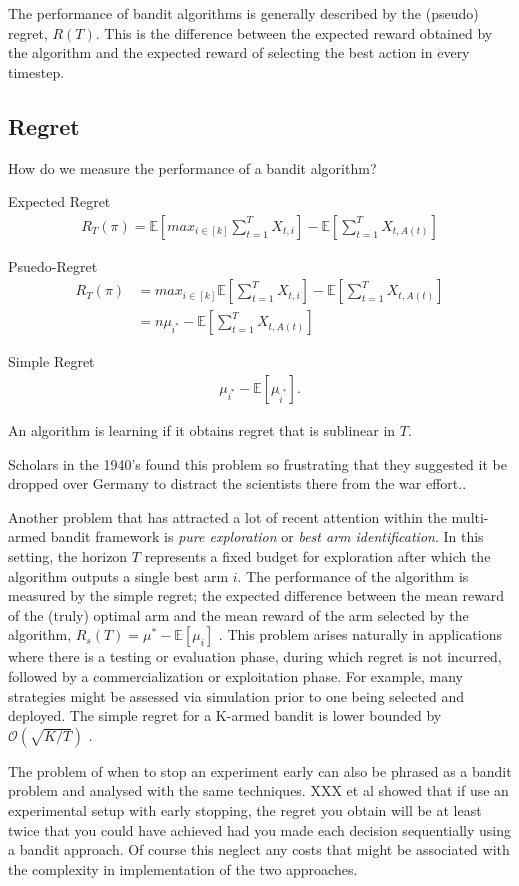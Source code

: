 \documentclass[11pt,a4paper,oneside]{book}
\newcommand{\simpleregret}{R_T}
\newcommand{\E}[1]{\mathbb E\left[{#1}\right]}
\newcommand{\eqn}[1]{\begin{align}#1\end{align}}
\newcommand{\bigo}[1]{\mathcal{O}\left( #1 \right)}
\begin{document}
The performance of bandit algorithms is generally described by the (pseudo) regret, $R(T)$. This is the difference between the expected reward obtained by the algorithm and the expected reward of selecting the best action in every timestep. 

\subsection*{Regret} How do we measure the performance of a bandit algorithm?


Expected Regret
\eqn{
R_T(\pi) = \E{max_{i \in [k]} \sum_{t=1}^T{X_{t,i}}} - \E{\sum_{t=1}^T{X_{t,A(t)}}}
}

Psuedo-Regret
\eqn{
R_T(\pi) &= max_{i \in [k]}\E{\sum_{t=1}^T{X_{t,i}}} - \E{\sum_{t=1}^T{X_{t,A(t)}}} \\
&= n\mu_{i^*} - \E{\sum_{t=1}^T{X_{t,A(t)}}}
}

Simple Regret
\eqn{
\mu_{i^*} - \E{\mu_{\hat i^*}}.
}


An algorithm is learning if it obtains regret that is sublinear in $T$. 

Scholars in the 1940's found this problem so frustrating that they suggested it be dropped over Germany to distract the scientists there from the war effort.\cite{XXX}. 


Another problem that has attracted a lot of recent attention \cite{Bubeck2009,Audibert2010,Gabillon2012,Karnin2013} within the multi-armed bandit framework is \textit{pure exploration} or \textit{best arm identification}. In this setting, the horizon $T$ represents a fixed budget for exploration after which the algorithm outputs a single best arm $i$. The performance of the algorithm is measured by the simple regret; the expected difference between the mean reward of the (truly) optimal arm and the mean reward of the arm selected by the algorithm, $R_s(T) = \mu^* - \E{\mu_i}$ . This problem arises naturally in applications where there is a testing or evaluation phase, during which regret is not incurred, followed by a commercialization or exploitation phase. For example, many strategies might be assessed via simulation prior to one being selected and deployed. The simple regret for a K-armed bandit is lower bounded by $\bigo{\sqrt{K/T}}$ \cite{Bubeck2009}.

The problem of when to stop an experiment early can also be phrased as a bandit problem and analysed with the same techniques. XXX et al showed that if use an experimental setup with early stopping, the regret you obtain will be at least twice that you could have achieved had you made each decision sequentially using a bandit approach. Of course this neglect any costs that might be associated with the complexity in implementation of the two approaches. 
\end{document}
